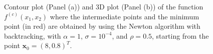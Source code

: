 \documentclass[a4paper,11pt]{article}
\begin{document}
	\begin{figure}[htb]
		\centering
		 \quad
		\caption{Contour plot (Panel (a)) and 3D plot (Panel (b)) of the function $f^{(c)}(x_{1},x_{2})$ where the intermediate points and the minimum point (in red) are obtained by using the Newton algorithm with backtracking, with $\alpha=1$, $\sigma=10^{-4}$, and $\rho=0.5$, starting from the point $\textbf{x}_{0}=(8,0.8)^{T}$.}
		\label{Fig:func_c_x0_2_backtracking}
	\end{figure}
	
\end{document}
